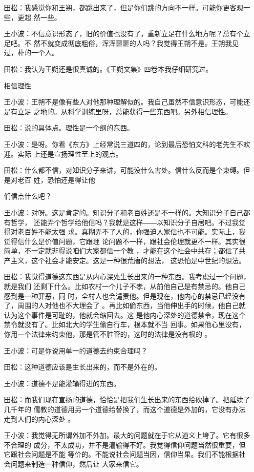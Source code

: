 田松：我感觉你和王朔，都跳出来了，但是你们跳的方向不一样。可能你更客观一些，更超
然一些。


王小波：不信意识形态了，旧的价值也没有了，重新立足在什么地方呢？总有个立足吧。不
然不就变成彻底粗俗，浑浑噩噩的人吗？我觉得王朔不是。王朔我见过，朴的一个人。


田松：我认为王朔还是很真诚的。《王朔文集》四卷本我仔细研究过。


相信理性


王小波：王朔不是像有些人对他那种理解似的。我自己虽然不信意识形态，可能还是有立足
之地的。从科学训练里呀，总能获得一些东西吧。另外相信理性。


田松：说的具体点。理性是一个纲的东西。


王小波：是呀。你看《东方》上经常说三道四的，论到最后恐怕文科的老先生不欢迎。实际
上还是宣扬理性至上的观点。


田松：什么都不信，对知识分子来讲，可能没什么害处。信什么反而是个束缚。但是对老百
姓，恐怕还是得让他


们信点什么吧？


王小波：对呀。这是肯定的。知识分子和老百姓还是不一样的。大知识分子自己都有哲学，
还能弄个哲学给他信吗？我就是这样――以知识分子自居吧。不过我觉得对老百姓不能太强
求。真糊弄不了人的，你强迫人家信也不可能。实际上，我觉得信什么是价值问题，它跟理
论问题不一样，跟社会伦理就更不一样。其实很简单，不一定就非得说咱们大家都信一个教
，才能在这个社会中共存；都信了共产主义，这个社会才能安定。这是一种很荒唐的想法，
这恐怕是中世纪的想法。


田松：我觉得道德这东西是从内心深处生长出来的一种东西。我考虑过一个问题，就是我们
还剩下什么。比如农村一个儿子不孝，从前他自己是有禁忌的。他自己感到是一种罪恶，同
时，全村人也会谴责他。但是现在，他内心的禁忌已经没有了，周围的人对他也不大理会了
。再比如偷东西，当他伸出手的时候，他自己就认为这个事件是可耻的，他就会缩回去。这
是他内心深处的道德禁令，现在这个禁令就没有了。比如北大的学生偷自行车，根本就不当
回事。如果他心里没有，你用一个法律来约束他，那是管不胜管的，这时的法律是没有根的
。


王小波：可是你说用单一的道德去约束合理吗？


田松：这种道德应该是生长出来的，而不是外在的。


王小波：道德不是能灌输得进的东西。


田松：而我们现在宣扬的道德，恰恰是把我们生长出来的东西给砍掉了。把延续了几千年的
儒教的道德用另一个道德给替换了，而这个道德是外加的，它没有办法走到人们的内心深处
。


王小波：我觉得无所谓外加不外加。最大的问题就在于它从道义上垮了。它有很多不合理的
成分，不太成功，并不是灌输得不好。我觉得信仰问题当然很重要，但它跟社会问题是不能
等价的。不能说社会问题当因，信仰当果。我们不能根据社会问题来制造一种信仰，然后让
大家来信它。


